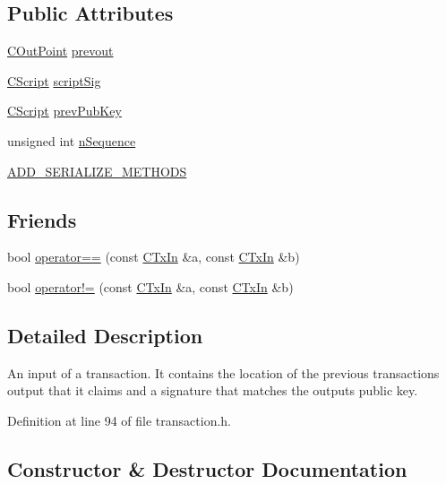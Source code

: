 \subsection*{Public Attributes}
\begin{DoxyCompactItemize}
\item 
\hyperlink{class_c_out_point}{C\+Out\+Point} \hyperlink{class_c_tx_in_aed9312051a25380cbd7f123408ab7c20}{prevout}
\item 
\hyperlink{class_c_script}{C\+Script} \hyperlink{class_c_tx_in_aba540fd902366210a6ad6cd9a18fe763}{script\+Sig}
\item 
\hyperlink{class_c_script}{C\+Script} \hyperlink{class_c_tx_in_a91732c5ffb13520a6989b162ff6683fc}{prev\+Pub\+Key}
\item 
unsigned int \hyperlink{class_c_tx_in_aa0dd08a6ecd0a595d9ef4dad020c1ea5}{n\+Sequence}
\item 
\hyperlink{class_c_tx_in_aad2fd3fef5ad4ebe7e54c0db0cc34be4}{A\+D\+D\+\_\+\+S\+E\+R\+I\+A\+L\+I\+Z\+E\+\_\+\+M\+E\+T\+H\+O\+D\+S}
\end{DoxyCompactItemize}
\subsection*{Friends}
\begin{DoxyCompactItemize}
\item 
bool \hyperlink{class_c_tx_in_a1bb37c4cd8573c3014a194e8ce4d8daa}{operator==} (const \hyperlink{class_c_tx_in}{C\+Tx\+In} \&a, const \hyperlink{class_c_tx_in}{C\+Tx\+In} \&b)
\item 
bool \hyperlink{class_c_tx_in_a4188c5f0807185c03e80598a7a3ace72}{operator!=} (const \hyperlink{class_c_tx_in}{C\+Tx\+In} \&a, const \hyperlink{class_c_tx_in}{C\+Tx\+In} \&b)
\end{DoxyCompactItemize}


\subsection{Detailed Description}
An input of a transaction. It contains the location of the previous transaction\textquotesingle{}s output that it claims and a signature that matches the output\textquotesingle{}s public key. 

Definition at line 94 of file transaction.\+h.



\subsection{Constructor \& Destructor Documentation}
\hypertarget{class_c_tx_in_abcf9f5a65b0a016b31912f4cd1f32c73}{}
